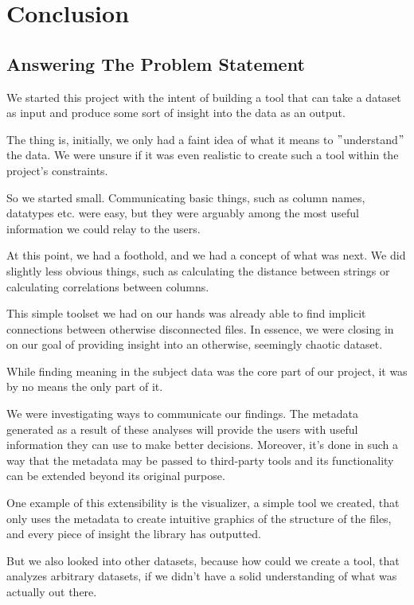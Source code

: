 \chapter{Conclusion}\label{ch:conclusion}

\section{Answering The Problem Statement}
We started this project with the intent of building a tool that can take a dataset as input
and produce some sort of insight into the data as an output.

The thing is, initially, we only had a faint idea of what it means to \("\)understand\("\)
the data.
We were unsure if it was even realistic to create such a tool within the project's constraints.

So we started small.
Communicating basic things, such as column names, datatypes etc.
were easy, but they were arguably among the most useful information we could relay to the users.

At this point, we had a foothold, and we had a concept of what was next.
We did slightly less obvious things, such as calculating the distance between strings or
calculating correlations between columns.

This simple toolset we had on our hands was already able to find implicit connections between
otherwise disconnected files.
In essence, we were closing in on our goal of providing insight into an otherwise, seemingly chaotic
dataset.

While finding meaning in the subject data was the core part of our project,
it was by no means the only part of it.

We were investigating ways to communicate our findings.
The metadata generated as a result of these analyses will provide the users with useful information
they can use to make better decisions.
Moreover, it's done in such a way that the metadata may be passed to third-party tools and
its functionality can be extended beyond its original purpose.

One example of this extensibility is the visualizer, a simple tool we created, that only
uses the metadata to create intuitive graphics of the structure of the files, and
every piece of insight the library has outputted.

But we also looked into other datasets,
because how could we create a tool, that analyzes arbitrary datasets, if
we didn't have a solid understanding of what was actually out there.

